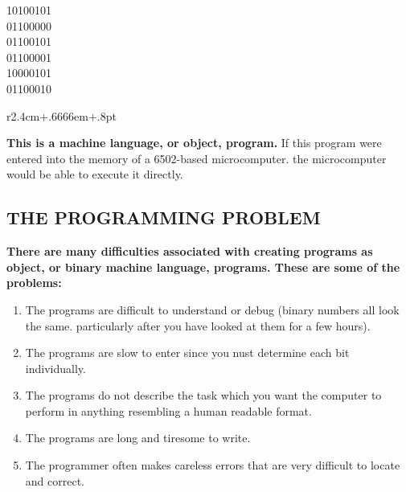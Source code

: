 \documentclass{book}
\begin{document}
\begin{center}
10100101\\
01100000\\
01100101\\
01100001\\
10000101\\
01100010\\
\end{center}


\begin{wrapfigure}{r}{2.4cm+.6666em+.8pt}
\end{wrapfigure}
\noindent\textbf{This is a machine language, or object, program.} If this program were entered into the memory of a 6502-based microcomputer. the microcomputer would be able to execute it directly.\\

\subsection*{THE PROGRAMMING PROBLEM}

\textbf{There are many difficulties associated with creating programs as object, or binary machine language, programs. These are some of the problems:}\\

\begin{enumerate}
     \item {The programs are difficult to understand or debug (binary numbers all look the same. particularly after you have looked at them for a few hours).}
     \item {The programs are slow to enter since you nust determine each bit individually.}
     \item {The programs do not describe the task which you want the computer to perform in anything resembling a human readable format.}
     \item {The programs are long and tiresome to write.}
     \item {The programmer often makes careless errors that are very difficult to locate and correct.}
\end{enumerate}
\end{document}
